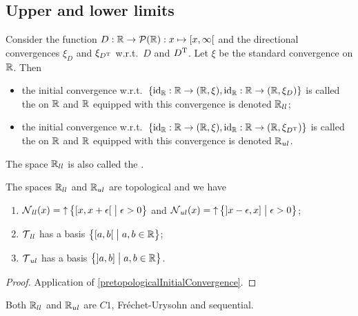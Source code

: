 \subsection{Upper and lower limits}
\begin{definition}
Consider the function $D: \R \to\powerset(\R): x\mapsto \interval[co]{x,\infty}$ and the directional convergences $\xi_D$ and $\xi_{D^{\mathrm{T}}}$ w.r.t.\ $D$ and $D^{\mathrm{T}}$. Let $\xi$ be the standard convergence on $\mathbb{R}$.
Then
\begin{itemize}
\item the initial convergence w.r.t.\ $\{\id_\R: \R\to \sSet{\R,\xi}, \id_\R: \R\to \sSet{\R,\xi_D}\}$ is called the  on $\mathbb{R}$ and $\mathbb{R}$ equipped with this convergence is denoted $\mathbb{R}_{ll}$;
\item the initial convergence w.r.t.\ $\{\id_\R: \R\to \sSet{\R,\xi}, \id_\R: \R\to \sSet{\R,\xi_{D^\transp}}\}$ is called the  on $\mathbb{R}$ and $\mathbb{R}$ equipped with this convergence is denoted $\mathbb{R}_{ul}$.
\end{itemize}
The space $\mathbb{R}_{ll}$ is also called the .
\end{definition}

\begin{proposition}
The spaces $\mathbb{R}_{ll}$ and $\mathbb{R}_{ul}$ are topological and we have
\begin{enumerate}
\item $\neighbourhoods_{ll}(x) = \upset \setbuilder[\big]{\interval[co]{x,x+\epsilon}}{\epsilon > 0}$ and $\neighbourhoods_{ul}(x) = \upset \setbuilder[\big]{\interval[oc]{x-\epsilon, x}}{\epsilon > 0}$;
\item $\operatorname{\mathcal{T}}_{ll}$ has a basis $\setbuilder[\big]{\interval[co]{a,b}}{a,b\in \R}$;
\item $\operatorname{\mathcal{T}}_{ul}$ has a basis $\setbuilder[\big]{\interval[oc]{a,b}}{a,b\in \R}$.
\end{enumerate}
\end{proposition}
\begin{proof}
Application of \ref{pretopologicalInitialConvergence}.
\end{proof}
\begin{corollary} \label{SorgenfreyLineC1}
Both $\mathbb{R}_{ll}$ and $\mathbb{R}_{ul}$ are $C1$, Fréchet-Urysohn and sequential.
\end{corollary}

